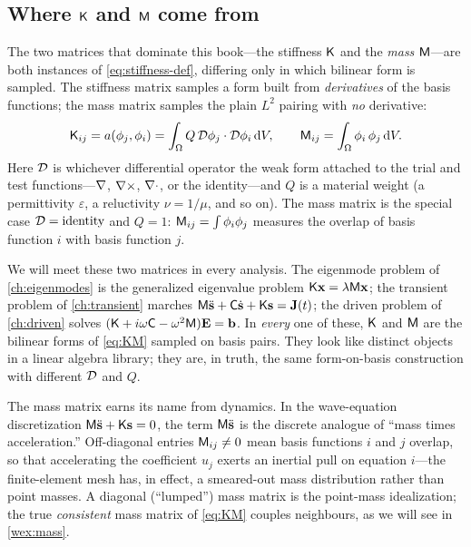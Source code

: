 \subsection{Where \texorpdfstring{$\mathsf{K}$}{K} and \texorpdfstring{$\mathsf{M}$}{M} come from}

The two matrices that dominate this book---the stiffness $\mathsf{K}$ and the
\emph{mass} $\mathsf{M}$---are both instances of \cref{eq:stiffness-def}, differing
only in which bilinear form is sampled. The stiffness matrix samples a form built
from \emph{derivatives} of the basis functions; the mass matrix samples the
plain $L^2$ pairing with \emph{no} derivative:
\begin{equation}
\mathsf{K}_{ij}=a(\phi_j,\phi_i)=\int_\Omega Q\,\mathcal{D}\phi_j\cdot\mathcal{D}\phi_i\,\mathrm{d}V,
\qquad
\mathsf{M}_{ij}=\int_\Omega \phi_i\,\phi_j\,\mathrm{d}V.
\label{eq:KM}
\end{equation}
Here $\mathcal{D}$ is whichever differential operator the weak form attached to the
trial and test functions---$\nabla$, $\nabla\times$, $\nabla\cdot$, or the identity---and $Q$ is
a material weight (a permittivity $\varepsilon$, a reluctivity $\nu=1/\mu$, and so
on). The mass matrix is the special case $\mathcal{D}=\text{identity}$ and $Q=1$:
$\mathsf{M}_{ij}=\int\phi_i\phi_j$ measures the overlap of basis function $i$ with
basis function $j$.

We will meet these two matrices in every analysis. The eigenmode problem of
\cref{ch:eigenmodes} is the generalized eigenvalue problem $\mathsf{K}\mathbf{x}=\lambda
\mathsf{M}\mathbf{x}$; the transient problem of \cref{ch:transient} marches
$\mathsf{M}\ddot{\mathbf{s}}+\mathsf{C}\dot{\mathbf{s}}+\mathsf{K}\mathbf{s}=\mathbf{J}(t)$; the driven problem of
\cref{ch:driven} solves $(\mathsf{K}+i\omega\mathsf{C}-\omega^2\mathsf{M})\mathbf{E}=\mathbf{b}$. In
\emph{every} one of these, $\mathsf{K}$ and $\mathsf{M}$ are the bilinear forms of
\cref{eq:KM} sampled on basis pairs. They look like distinct objects in a linear
algebra library; they are, in truth, the same form-on-basis construction with
different $\mathcal{D}$ and $Q$.

\begin{physicsbox}
The mass matrix earns its name from dynamics. In the wave-equation
discretization $\mathsf{M}\ddot{\mathbf{s}}+\mathsf{K}\mathbf{s}=0$, the term $\mathsf{M}\ddot{\mathbf{s}}$ is
the discrete analogue of ``mass times acceleration.'' Off-diagonal entries
$\mathsf{M}_{ij}\neq0$ mean basis functions $i$ and $j$ overlap, so that
accelerating the coefficient $u_j$ exerts an inertial pull on equation $i$---the
finite-element mesh has, in effect, a smeared-out mass distribution rather than
point masses. A diagonal (``lumped'') mass matrix is the point-mass
idealization; the true \emph{consistent} mass matrix of \cref{eq:KM} couples
neighbours, as we will see in \cref{wex:mass}.
\end{physicsbox}

